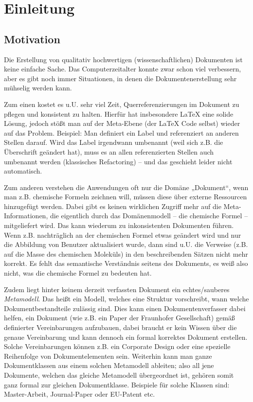 \newcommand{\scaltex}{Scaltex's Latex Projection}
 
 
\chapter{Einleitung}\label{}
 
\section{Motivation}\label{}
 
Die Erstellung von qualitativ hochwertigen (wissenschaftlichen) Dokumenten ist keine einfache Sache. Das Computerzeitalter konnte zwar schon viel verbessern, aber es gibt noch immer Situationen, in denen die Dokumentenerstellung sehr mühselig werden kann.

 
Zum einen kostet es u.U. sehr viel Zeit, Querreferenzierungen im Dokument zu pflegen und konsistent zu halten. Hierfür hat insbesondere LaTeX eine solide Lösung, jedoch stößt man auf der Meta-Ebene (der LaTeX Code selbst) wieder auf das Problem. Beispiel: Man definiert ein Label und referenziert an anderen Stellen darauf. Wird das Label irgendwann umbenannt (weil sich z.B. die Überschrift geändert hat), muss es an allen referenzierten Stellen auch umbenannt werden (klassisches Refactoring) -- und das geschieht leider nicht automatisch.

 
Zum anderen verstehen die Anwendungen oft nur die Domäne „Dokument“, wenn man z.B. chemische Formeln zeichnen will, müssen diese über externe Ressourcen hinzugefügt werden. Dabei gibt es keinen wirklichen Zugriff mehr auf die Meta-Informationen, die eigentlich durch das Domänenmodell -- die chemische Formel -- mitgeliefert wird. Das kann wiederum zu inkonsistenten Dokumenten führen. Wenn z.B. nachträglich an der chemischen Formel etwas geändert wird und nur die Abbildung von Benutzer aktualisiert wurde, dann sind u.U. die Verweise (z.B. auf die Masse des chemischen Moleküls) in den beschreibenden Sätzen nicht mehr korrekt. Es fehlt das semantische Verständnis seitens des Dokuments, es weiß also nicht, was die chemische Formel zu bedeuten hat.

 
Zudem liegt hinter keinem derzeit verfassten Dokument ein echtes/sauberes \emph{Metamodell}. Das heißt ein Modell, welches eine Struktur vorschreibt, wann welche Dokumentbestandteile zulässig sind. Dies kann einen Dokumentenverfasser dabei helfen, ein Dokument (wie z.B. ein Paper der Fraunhofer Gesellschaft) gemäß definierter Vereinbarungen aufzubauen, dabei braucht er kein Wissen über die genaue Vereinbarung und kann dennoch ein formal korrektes Dokument erstellen. Solche Vereinbarungen können z.B. ein Corporate Design oder eine spezielle Reihenfolge von Dokumentelementen sein. Weiterhin kann man ganze Dokumentklassen aus einem solchen Metamodell ableiten; also all jene Dokumente, welchen das gleiche Metamodell übergeordnet ist, gehören somit ganz formal zur gleichen Dokumentklasse. Beispiele für solche Klassen sind: Master-Arbeit, Journal-Paper oder EU-Patent etc.

